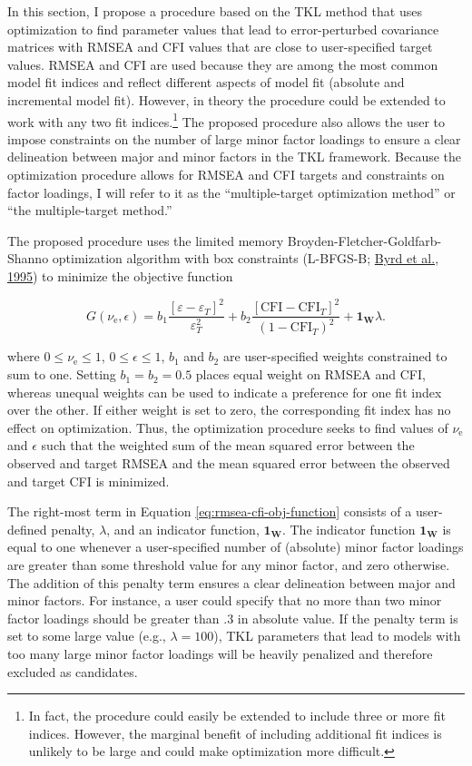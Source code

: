 \documentclass[11pt]{umnthesis}
\begin{document}
In this section, I propose a procedure based on the TKL method that uses optimization to find parameter values that lead to error-perturbed covariance matrices with RMSEA and CFI values that are close to user-specified target values. RMSEA and CFI are used because they are among the most common model fit indices and reflect different aspects of model fit (absolute and incremental model fit). However, in theory the procedure could be extended to work with any two fit indices.\footnote{In fact, the procedure could easily be extended to include three or more fit indices. However, the marginal benefit of including additional fit indices is unlikely to be large and could make optimization more difficult.} The proposed procedure also allows the user to impose constraints on the number of large minor factor loadings to ensure a clear delineation between major and minor factors in the TKL framework. Because the optimization procedure allows for RMSEA and CFI targets and constraints on factor loadings, I will refer to it as the ``multiple-target optimization method'' or ``the multiple-target method.''

The proposed procedure uses the limited memory Broyden-Fletcher-Goldfarb-Shanno optimization algorithm with box constraints (L-BFGS-B; \protect\hyperlink{ref-byrd1995}{Byrd et al., 1995}) to minimize the objective function

\begin{equation}
G(\nu_\textrm{e}, \epsilon) = b_1 \frac{\left[ \varepsilon - \varepsilon_T \right]^2}{\varepsilon_T^2} + b_2 \frac{\left[ \textrm{CFI} - \textrm{CFI}_T \right]^2}{\left( 1 - \textrm{CFI}_T \right)^2} + \mathbf{1}_{\bm{W}} \lambda.
\label{eq:rmsea-cfi-obj-function}
\end{equation}

\noindent where \(0 \leq \nu_\textrm{e} \leq 1\), \(0 \leq \epsilon \leq 1\), \(b_1\) and \(b_2\) are user-specified weights constrained to sum to one. Setting \(b_1 = b_2 = 0.5\) places equal weight on RMSEA and CFI, whereas unequal weights can be used to indicate a preference for one fit index over the other. If either weight is set to zero, the corresponding fit index has no effect on optimization. Thus, the optimization procedure seeks to find values of \(\nu_\textrm{e}\) and \(\epsilon\) such that the weighted sum of the mean squared error between the observed and target RMSEA and the mean squared error between the observed and target CFI is minimized.

The right-most term in Equation \eqref{eq:rmsea-cfi-obj-function} consists of a user-defined penalty, \(\lambda\), and an indicator function, \(\mathbf{1}_{\bm{W}}\). The indicator function \(\mathbf{1}_{\bm{W}}\) is equal to one whenever a user-specified number of (absolute) minor factor loadings are greater than some threshold value for any minor factor, and zero otherwise. The addition of this penalty term ensures a clear delineation between major and minor factors. For instance, a user could specify that no more than two minor factor loadings should be greater than .3 in absolute value. If the penalty term is set to some large value (e.g., \(\lambda = 100\)), TKL parameters that lead to models with too many large minor factor loadings will be heavily penalized and therefore excluded as candidates.
\end{document}
